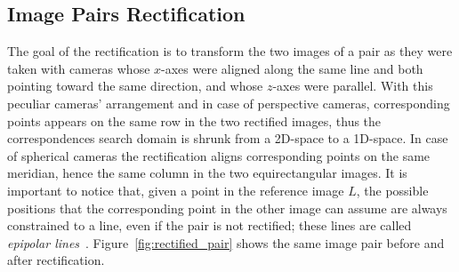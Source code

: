 \subsection{Image Pairs Rectification}
\label{subsec:rectification}
The goal of the rectification is to transform the two images of a pair
as they were taken
with cameras whose $x$-axes were aligned along the same line and both pointing
toward the same direction, and whose $z$-axes were parallel.
With this peculiar cameras' arrangement and in case of perspective cameras,
corresponding points appears on the same row in the two rectified
images, thus the correspondences search domain is shrunk from a
2D-space to a 1D-space. In case of spherical cameras the rectification aligns
corresponding points on the same meridian, hence the same column in the two
equirectangular images.
It is important to notice that, given a point in the reference image $L$,
the possible positions that the corresponding point in the other image can
assume are always constrained to a line, even if the pair is not
rectified; these lines are called
\emph{epipolar lines}~\cite{Hartley2004,szeliski2010computer}.
Figure~\ref{fig:rectified_pair} shows the same image pair
before and after rectification.
%
